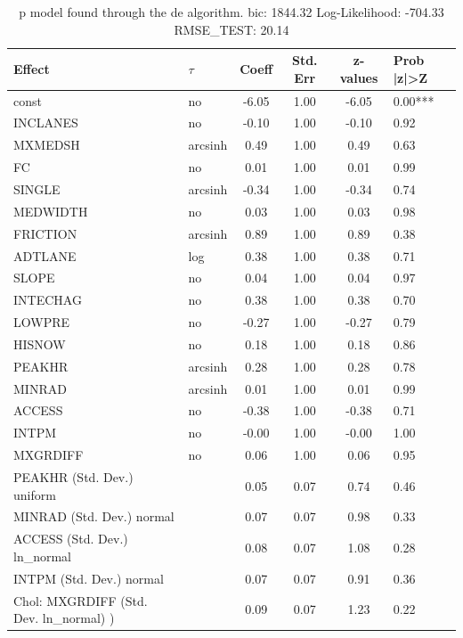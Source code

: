 \begin{table}
	\caption{p model found through the de algorithm. bic: 1844.32 Log-Likelihood: -704.33 RMSE_TEST: 20.14}
	\begin{center}
		\begin{tabular}{|l|l|c|c|c|l|}
			\hline
			Effect & $\tau$ & Coeff & Std. Err & z-values & Prob |z|>Z \\
			\hline
			const & no & -6.05 & 1.00 & -6.05 & 0.00*** \\
			\hline
			INCLANES & no & -0.10 & 1.00 & -0.10 & 0.92 \\
			\hline
			MXMEDSH & arcsinh & 0.49 & 1.00 & 0.49 & 0.63 \\
			\hline
			FC & no & 0.01 & 1.00 & 0.01 & 0.99 \\
			\hline
			SINGLE & arcsinh & -0.34 & 1.00 & -0.34 & 0.74 \\
			\hline
			MEDWIDTH & no & 0.03 & 1.00 & 0.03 & 0.98 \\
			\hline
			FRICTION & arcsinh & 0.89 & 1.00 & 0.89 & 0.38 \\
			\hline
			ADTLANE & log & 0.38 & 1.00 & 0.38 & 0.71 \\
			\hline
			SLOPE & no & 0.04 & 1.00 & 0.04 & 0.97 \\
			\hline
			INTECHAG & no & 0.38 & 1.00 & 0.38 & 0.70 \\
			\hline
			LOWPRE & no & -0.27 & 1.00 & -0.27 & 0.79 \\
			\hline
			HISNOW & no & 0.18 & 1.00 & 0.18 & 0.86 \\
			\hline
			PEAKHR & arcsinh & 0.28 & 1.00 & 0.28 & 0.78 \\
			\hline
			MINRAD & arcsinh & 0.01 & 1.00 & 0.01 & 0.99 \\
			\hline
			ACCESS & no & -0.38 & 1.00 & -0.38 & 0.71 \\
			\hline
			INTPM & no & -0.00 & 1.00 & -0.00 & 1.00 \\
			\hline
			MXGRDIFF & no & 0.06 & 1.00 & 0.06 & 0.95 \\
			\hline
			PEAKHR (Std. Dev.) uniform &  & 0.05 & 0.07 & 0.74 & 0.46 \\
			\hline
			MINRAD (Std. Dev.) normal &  & 0.07 & 0.07 & 0.98 & 0.33 \\
			\hline
			ACCESS (Std. Dev.) ln_normal &  & 0.08 & 0.07 & 1.08 & 0.28 \\
			\hline
			INTPM (Std. Dev.) normal &  & 0.07 & 0.07 & 0.91 & 0.36 \\
			\hline
			 Chol: MXGRDIFF (Std. Dev. ln_normal) ) &  & 0.09 & 0.07 & 1.23 & 0.22 \\
			\hline
		\end{tabular}
	\end{center}
\end{table}
